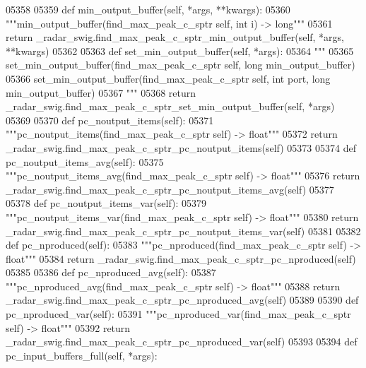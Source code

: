 \begin{DoxyCode}
{{{{{{{{{{{{{{{{{{05358 
05359     \textcolor{keyword}{def }min_output_buffer(self, *args, **kwargs):
05360         \textcolor{stringliteral}{"""min\_output\_buffer(find\_max\_peak\_c\_sptr self, int i) -> long"""}
05361         \textcolor{keywordflow}{return} \_radar\_swig.find\_max\_peak\_c\_sptr\_min\_output\_buffer(self, *args, **kwargs)
05362 
05363     \textcolor{keyword}{def }set_min_output_buffer(self, *args):
05364         \textcolor{stringliteral}{"""}
05365 \textcolor{stringliteral}{        set\_min\_output\_buffer(find\_max\_peak\_c\_sptr self, long min\_output\_buffer)}
05366 \textcolor{stringliteral}{        set\_min\_output\_buffer(find\_max\_peak\_c\_sptr self, int port, long min\_output\_buffer)}
05367 \textcolor{stringliteral}{        """}
05368         \textcolor{keywordflow}{return} \_radar\_swig.find\_max\_peak\_c\_sptr\_set\_min\_output\_buffer(self, *args)
05369 
05370     \textcolor{keyword}{def }pc_noutput_items(self):
05371         \textcolor{stringliteral}{"""pc\_noutput\_items(find\_max\_peak\_c\_sptr self) -> float"""}
05372         \textcolor{keywordflow}{return} \_radar\_swig.find\_max\_peak\_c\_sptr\_pc\_noutput\_items(self)
05373 
05374     \textcolor{keyword}{def }pc_noutput_items_avg(self):
05375         \textcolor{stringliteral}{"""pc\_noutput\_items\_avg(find\_max\_peak\_c\_sptr self) -> float"""}
05376         \textcolor{keywordflow}{return} \_radar\_swig.find\_max\_peak\_c\_sptr\_pc\_noutput\_items\_avg(self)
05377 
05378     \textcolor{keyword}{def }pc_noutput_items_var(self):
05379         \textcolor{stringliteral}{"""pc\_noutput\_items\_var(find\_max\_peak\_c\_sptr self) -> float"""}
05380         \textcolor{keywordflow}{return} \_radar\_swig.find\_max\_peak\_c\_sptr\_pc\_noutput\_items\_var(self)
05381 
05382     \textcolor{keyword}{def }pc_nproduced(self):
05383         \textcolor{stringliteral}{"""pc\_nproduced(find\_max\_peak\_c\_sptr self) -> float"""}
05384         \textcolor{keywordflow}{return} \_radar\_swig.find\_max\_peak\_c\_sptr\_pc\_nproduced(self)
05385 
05386     \textcolor{keyword}{def }pc_nproduced_avg(self):
05387         \textcolor{stringliteral}{"""pc\_nproduced\_avg(find\_max\_peak\_c\_sptr self) -> float"""}
05388         \textcolor{keywordflow}{return} \_radar\_swig.find\_max\_peak\_c\_sptr\_pc\_nproduced\_avg(self)
05389 
05390     \textcolor{keyword}{def }pc_nproduced_var(self):
05391         \textcolor{stringliteral}{"""pc\_nproduced\_var(find\_max\_peak\_c\_sptr self) -> float"""}
05392         \textcolor{keywordflow}{return} \_radar\_swig.find\_max\_peak\_c\_sptr\_pc\_nproduced\_var(self)
05393 
05394     \textcolor{keyword}{def }pc_input_buffers_full(self, *args):
}}}}}}}}}}}}}}}}}}
\end{DoxyCode}
